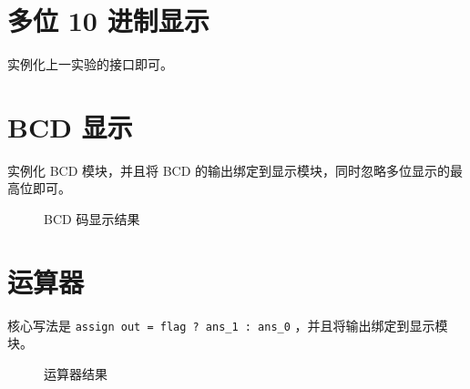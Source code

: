 \documentclass[lang=cn,11pt,a4paper,cite=authoryear]{elegantpaper}
\begin{document}
\section{多位 10 进制显示}

实例化上一实验的接口即可。


\section{BCD 显示}

实例化 BCD 模块，并且将 BCD 的输出绑定到显示模块，同时忽略多位显示的最高位即可。

\begin{figure}
    \centering
    \caption{BCD 码显示结果}\label{03} 
     \hfill 
     \hfill 
\end{figure}

\section{运算器}

核心写法是 \lstinline{assign out = flag ? ans_1 : ans_0} ，并且将输出绑定到显示模块。

\begin{figure}
    \centering
    \caption{运算器结果}\label{05} 
    \bigskip
    \bigskip
\end{figure}

\end{document}
